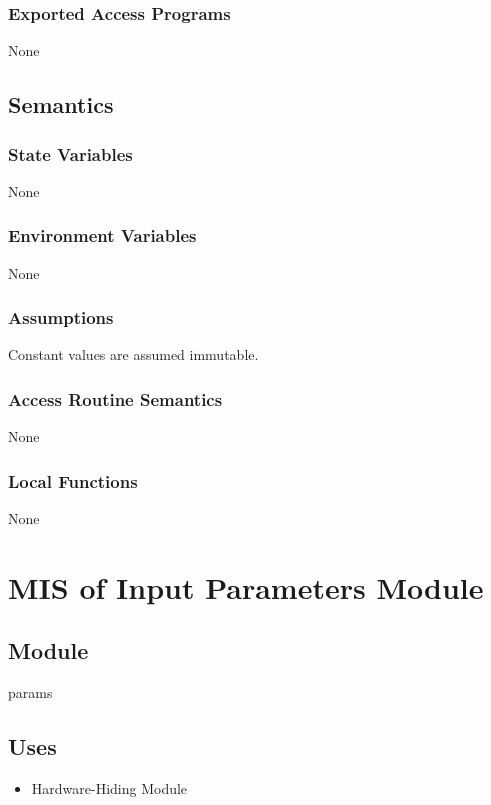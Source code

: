 \documentclass[12pt, titlepage]{article}
\begin{document}
\subsubsection{Exported Access Programs}
None 

\subsection{Semantics}

\subsubsection{State Variables}
None

\subsubsection{Environment Variables}
None

\subsubsection{Assumptions}
Constant values are assumed immutable. 

\subsubsection{Access Routine Semantics}
None

\subsubsection{Local Functions}
None



\section{MIS of Input Parameters Module} \label{MISInpParam}

\subsection{Module}
params 

\subsection{Uses}
\begin{itemize}
  \item Hardware-Hiding Module
\end{itemize}
\end{document}
